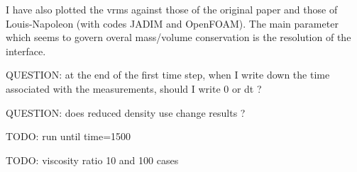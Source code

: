 

I have also plotted the vrms against those of the original paper and those of Louis-Napoleon \etal \cite{logb20}
(with codes JADIM and OpenFOAM). 
The main parameter which seems to govern overal mass/volume conservation is the resolution of the interface. 

QUESTION: at the end of the first time step, when I write down the time associated with the measurements, should I write 0
or dt ?

QUESTION: does reduced density use change results ?

TODO: run until time=1500

TODO: viscosity ratio 10 and 100 cases

